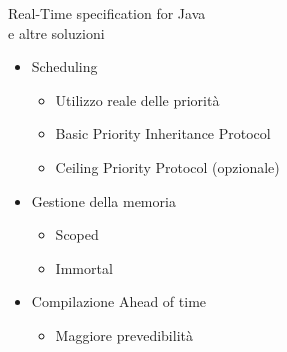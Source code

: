 \begin{frame}{Real-Time specification for Java \\e altre soluzioni}
	\begin{itemize}
		\item Scheduling
		\begin{itemize}
			\item Utilizzo reale delle priorità
			\item Basic Priority Inheritance Protocol
			\item Ceiling Priority Protocol (opzionale)
		\end{itemize}
		\item Gestione della memoria
		\begin{itemize}
			\item Scoped
			\item Immortal
		\end{itemize}
		\item Compilazione Ahead of time
		\begin{itemize}
			\item Maggiore prevedibilità
		\end{itemize}
	\end{itemize}
\end{frame}